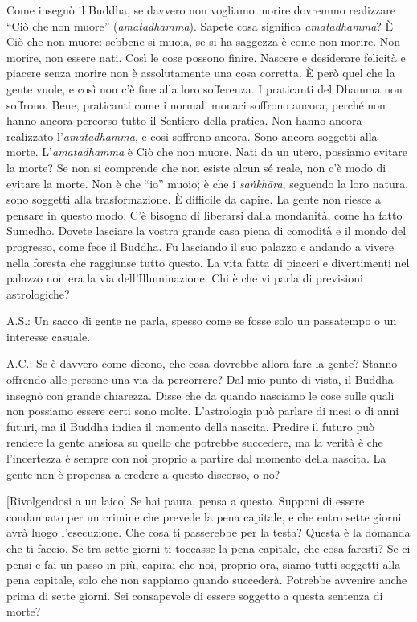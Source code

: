 Come insegnò il Buddha, se davvero non vogliamo morire dovremmo
realizzare ``Ciò che non muore'' (\emph{amatadhamma}). Sapete cosa
significa \emph{amatadhamma}? È Ciò che non muore: sebbene si muoia, se
si ha saggezza è come non morire. Non morire, non essere nati. Così le
cose possono finire. Nascere e desiderare felicità e piacere senza
morire non è assolutamente una cosa corretta. È però quel che la gente
vuole, e così non c'è fine alla loro sofferenza. I praticanti del Dhamma
non soffrono. Bene, praticanti come i normali monaci soffrono ancora,
perché non hanno ancora percorso tutto il Sentiero della pratica. Non
hanno ancora realizzato l'\emph{amatadhamma}, e così soffrono ancora.
Sono ancora soggetti alla morte. L'\emph{amatadhamma} è Ciò che non
muore. Nati da un utero, possiamo evitare la morte? Se non si comprende
che non esiste alcun sé reale, non c'è modo di evitare la morte. Non è
che ``io'' muoio; è che i \emph{saṅkhāra}, seguendo la loro natura, sono
soggetti alla trasformazione. È difficile da capire. La gente non riesce
a pensare in questo modo. C'è bisogno di liberarsi dalla mondanità, come
ha fatto Sumedho. Dovete lasciare la vostra grande casa piena di
comodità e il mondo del progresso, come fece il Buddha. Fu lasciando il
suo palazzo e andando a vivere nella foresta che raggiunse tutto questo.
La vita fatta di piaceri e divertimenti nel palazzo non era la via
dell'Illuminazione. Chi è che vi parla di previsioni astrologiche?

A.S.: Un sacco di gente ne parla, spesso come se fosse solo un
passatempo o un interesse casuale.

A.C.: Se è davvero come dicono, che cosa dovrebbe allora fare la gente?
Stanno offrendo alle persone una via da percorrere? Dal mio punto di
vista, il Buddha insegnò con grande chiarezza. Disse che da quando
nasciamo le cose sulle quali non possiamo essere certi sono molte.
L'astrologia può parlare di mesi o di anni futuri, ma il Buddha indica
il momento della nascita. Predire il futuro può rendere la gente ansiosa
su quello che potrebbe succedere, ma la verità è che l'incertezza è
sempre con noi proprio a partire dal momento della nascita. La gente non
è propensa a credere a questo discorso, o no?

{[}Rivolgendosi a un laico{]} Se hai paura, pensa a questo. Supponi di
essere condannato per un crimine che prevede la pena capitale, e che
entro sette giorni avrà luogo l'esecuzione. Che cosa ti passerebbe per
la testa? Questa è la domanda che ti faccio. Se tra sette giorni ti
toccasse la pena capitale, che cosa faresti? Se ci pensi e fai un passo
in più, capirai che noi, proprio ora, siamo tutti soggetti alla pena
capitale, solo che non sappiamo quando succederà. Potrebbe avvenire
anche prima di sette giorni. Sei consapevole di essere soggetto a questa
sentenza di morte?

